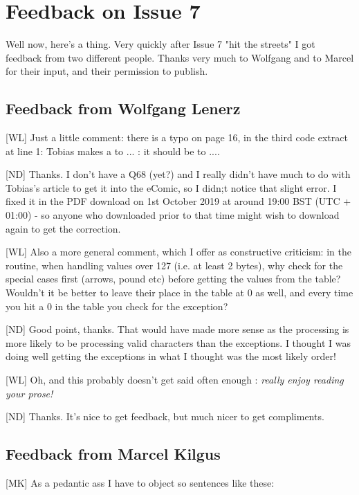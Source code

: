 \chapter{Feedback on Issue 7}

Well now, here's a thing. Very quickly after Issue 7 "hit the streets" I got feedback from two different people. Thanks very much to Wolfgang and to Marcel for their input, and their permission to publish.


\section{Feedback from Wolfgang Lenerz}

[WL] Just a little comment: there is a typo on page 16, in the third code extract at line 1: Tobias makes a  to ... : it should be to ....

[ND] Thanks. I don't have a Q68 (yet?) and I really didn't have much to do with Tobias's article to get it into the eComic, so I didn;t notice that slight error. I fixed it in the PDF download on 1st October 2019 at around 19:00 BST (UTC + 01:00) - so anyone who downloaded prior to that time might wish to download again to get the correction.


[WL] Also a more general comment, which I offer as constructive criticism: in the  routine, when handling values over 127 (i.e. at least 2 bytes), why check for the special cases first (arrows, pound etc) before getting the values from the table? Wouldn't it be better to leave their place in the table at 0 as well, and every time you hit a 0 in the table you check for the exception?

[ND] Good point, thanks. That would have made more sense as the processing is more likely to be processing valid characters than the exceptions. I thought I was doing well getting the exceptions in what I thought was the most likely order!


[WL] Oh, and this probably doesn't get said often enough : \emph{ really enjoy reading your prose!}

[ND] Thanks. It's nice to get feedback, but much nicer to get compliments. 



\section{Feedback from Marcel Kilgus}

[MK] As a pedantic ass I have to object so sentences like these:


